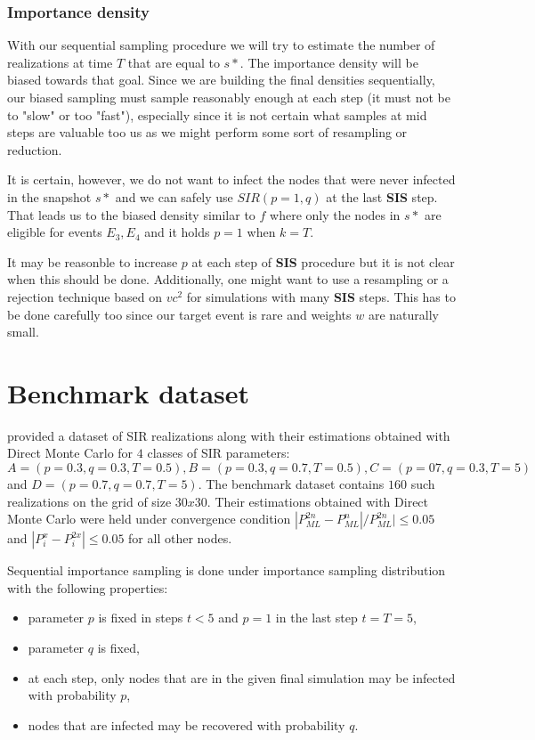 \documentclass[times, utf8, diplomski]{fer}
\begin{document}
\subsection{Importance density}
With our sequential sampling procedure we will try to estimate the number of realizations at time $T$ that are equal to $s*$. The importance density will be biased towards that goal. Since we are building the final densities sequentially, our biased sampling must sample reasonably enough at each step (it must not be to "slow" or too "fast"), especially since it is not certain what samples at mid steps are valuable too us as we might perform some sort of  resampling or reduction.

It is certain, however, we do not want to infect the nodes that were never infected in the snapshot $s*$ and we can safely use $SIR(p = 1, q)$ at the last \textbf{SIS} step. That leads us to the biased density similar to $f$ where only the nodes in $s*$ are eligible for events $E_3, E_4$ and it holds $p = 1$ when $k = T$.

It may be reasonble to increase $p$ at each step of \textbf{SIS} procedure but it is not clear when this should be done. Additionally, one might want to use a resampling or a rejection technique based on $vc^2$ for simulations with many  \textbf{SIS} steps. This has to be done carefully too since our target event is rare and weights $w$ are naturally small.


\chapter{Benchmark dataset}
\cite{Nino} provided a dataset of SIR realizations along with their estimations obtained with Direct Monte Carlo for $4$ classes of SIR parameters: $A = (p = 0.3, q = 0.3, T =0 .5), B = (p = 0.3, q = 0.7, T = 0.5), C = (p = 07, q = 0.3, T = 5)$ and  $D = (p = 0.7, q = 0.7, T = 5)$. The benchmark dataset contains $160$ such realizations on the grid of size $30x30$.
 Their estimations obtained with Direct Monte Carlo were held under convergence condition $|P_{ML}^{2n} - P_{ML}^{n}| / P_{ML}^{2n}| \leq 0.05$  and $|P_i^x - P_i^{2x}| \leq 0.05$ for all other nodes.
 
Sequential importance sampling is done under importance sampling distribution with the following properties:
\begin{itemize}
\item{parameter $p$ is fixed in steps $t<5$ and $p=1$ in the last step $t= T = 5$,}
\item{parameter $q$ is fixed,}
\item{at each step, only nodes that are in the given final simulation may be infected with probability $p$,}
\item{nodes that are infected may be recovered with probability $q$.}
\end{itemize}
\end{document}

